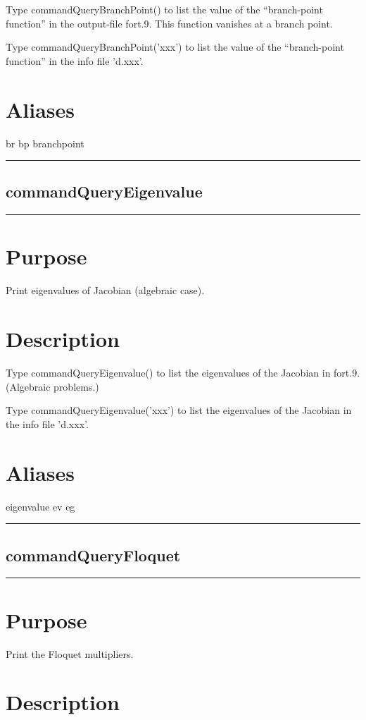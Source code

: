 \documentclass[12pt]{report}
\begin{document}
\begin{minipage}{6in}
    Type commandQueryBranchPoint() to list the value of the ``branch-point function'' 
    in the output-file fort.9. This function vanishes at a branch point.
    
    Type commandQueryBranchPoint('xxx') to list the value of the ``branch-point function''
    in the info file 'd.xxx'.
    \section*{Aliases}
br bp branchpoint \medskip\hrule\end{minipage}\subsection{commandQueryEigenvalue} \label{sec:clui_ref_commandQueryEigenvalue}\begin{minipage}{6in}\hrule\medskip\section*{Purpose}
Print eigenvalues of Jacobian (algebraic case).\section*{Description}

    Type commandQueryEigenvalue() to list the eigenvalues of the Jacobian 
    in fort.9. 
    (Algebraic problems.)

    Type commandQueryEigenvalue('xxx') to list the eigenvalues of the Jacobian 
    in the info file 'd.xxx'.
    \section*{Aliases}
eigenvalue ev eg \medskip\hrule\end{minipage}\subsection{commandQueryFloquet} \label{sec:clui_ref_commandQueryFloquet}\begin{minipage}{6in}\hrule\medskip\section*{Purpose}
Print the Floquet multipliers.\section*{Description}


\end{minipage}
\end{document}
